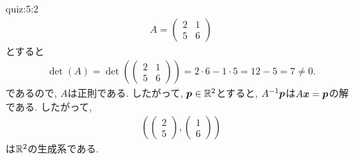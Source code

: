 \begin{answerof}{quiz:5:2}
  \begin{align*}
    A=
    \begin{pmatrix}
      2&1\\5&6
    \end{pmatrix}
  \end{align*}
  とすると
  \begin{align*}
    \det(A)=
    \det(\begin{pmatrix}
      2&1\\5&6
    \end{pmatrix})=2\cdot 6 -1\cdot 5=12-5=7\neq 0.
 \end{align*}
  であるので, $A$は正則である.
  したがって, $\boldsymbol{p}\in\mathbb{R}^2$とすると,
  $A^{-1}\boldsymbol{p}$は$A\boldsymbol{x}=\boldsymbol{p}$の解である.
  したがって,
  \begin{align*}
   (\begin{pmatrix}2\\5\end{pmatrix},\begin{pmatrix}1\\6\end{pmatrix})
  \end{align*}
  は$\mathbb{R}^2$の生成系である.



\end{answerof}
